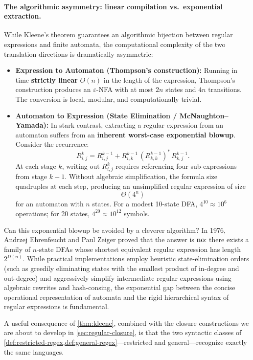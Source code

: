 \paragraph{The algorithmic asymmetry: linear compilation vs.\ exponential extraction.}
While Kleene's theorem guarantees an algorithmic bijection between regular expressions and finite automata, the computational complexity of the two translation directions is dramatically asymmetric:
\begin{itemize}[leftmargin=1.4em]
  \item \textbf{Expression to Automaton (Thompson's construction):} Running in time \textbf{strictly linear} $O(n)$ in the length of the expression, Thompson's construction produces an $\varepsilon$-NFA with at most $2n$ states and $4n$ transitions. The conversion is local, modular, and computationally trivial.
  \item \textbf{Automaton to Expression (State Elimination / McNaughton--Yamada):} In stark contrast, extracting a regular expression from an automaton suffers from an \textbf{inherent worst-case exponential blowup}.
  Consider the recurrence:
  \[
    R_{i,j}^k = R_{i,j}^{k-1} + R_{i,k}^{k-1}\,(R_{k,k}^{k-1})^*\,R_{k,j}^{k-1}.
  \]
  At each stage $k$, writing out $R_{i,j}^k$ requires referencing four sub-expressions from stage $k-1$. Without algebraic simplification, the formula size quadruples at each step, producing an unsimplified regular expression of size
  \[
    \Theta(4^n)
  \]
  for an automaton with $n$ states. For a modest 10-state DFA, $4^{10} \approx 10^6$ operations; for 20 states, $4^{20} \approx 10^{12}$ symbols.
\end{itemize}
Can this exponential blowup be avoided by a cleverer algorithm? In 1976, Andrzej Ehrenfeucht and Paul Zeiger proved that the answer is \textbf{no}: there exists a family of $n$-state DFAs whose shortest equivalent regular expression has length $2^{\Omega(n)}$. While practical implementations employ heuristic state-elimination orders (such as greedily eliminating states with the smallest product of in-degree and out-degree) and aggressively simplify intermediate regular expressions using algebraic rewrites and hash-consing, the exponential gap between the concise operational representation of automata and the rigid hierarchical syntax of regular expressions is fundamental.

A useful consequence of \cref{thm:kleene}, combined with the closure
constructions we are about to develop in \cref{sec:regular-closure}, is
that the two syntactic classes of
\cref{def:restricted-regex,def:general-regex}---restricted and
general---recognize exactly the same languages.

